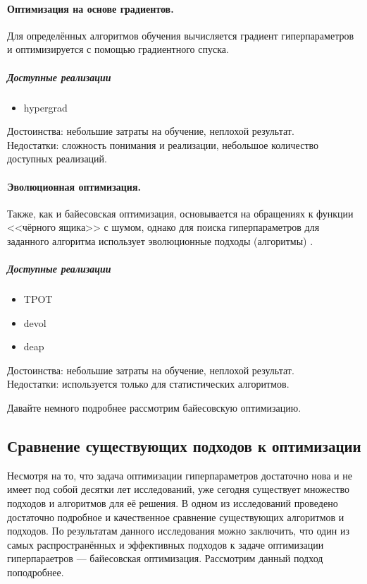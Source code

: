 \documentclass[times,specification,annotation]{itmo-student-thesis}
\begin{document}
	\paragraph{Оптимизация на основе градиентов.}  Для определённых алгоритмов обучения вычисляется градиент гиперпараметров и оптимизируется с помощью градиентного спуска.
		\subparagraph{Доступные реализации}
		\begin{itemize}
			\item hypergrad \cite{maclaurin2015gradientbased}
		\end{itemize}
		Достоинства: небольшие затраты на обучение, неплохой результат. \\
		Недостатки: сложность понимания и реализации, небольшое количество доступных реализаций.
	\paragraph{Эволюционная оптимизация.} Также, как и байесовская оптимизация, основывается на обращениях к функции <<чёрного ящика>> с шумом, однако для поиска гиперпараметров для заданного алгоритма использует эволюционные подходы (алгоритмы) \cite{NIPS2011_4443}.
		\subparagraph{Доступные реализации}
		\begin{itemize}
			\item TPOT \cite{gijsbers2018layered}
			\item devol \cite{9072880}
			\item deap \cite{DEAP_JMLR2012}
		\end{itemize}
		Достоинства: небольшие затраты на обучение, неплохой результат. \\
		Недостатки: используется только для статистических алгоритмов. 
		
	Давайте немного подробнее рассмотрим байесовскую оптимизацию.
	
	\subsection{Сравнение существующих подходов к оптимизации} \label{ss:comparison}
	Несмотря на то, что задача оптимизации гиперпараметров достаточно нова и не имеет под собой десятки лет исследований, уже сегодня существует множество подходов и алгоритмов для её решения. В одном из исследований \cite{yu2020hyperparameter} проведено достаточно подробное и качественное сравнение существующих алгоритмов и подходов. По результатам данного исследования можно заключить, что один из самых распространённых и эффективных подходов к задаче оптимизации гиперпараетров --- байесовская оптимизация. Рассмотрим данный подход поподробнее.
	
\end{document}
